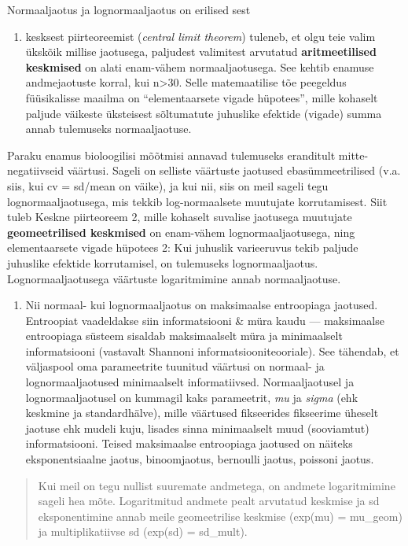 \documentclass[]{book}
\providecommand{\tightlist}{%
  \setlength{\itemsep}{0pt}\setlength{\parskip}{0pt}}
\begin{document}
Normaaljaotus ja lognormaaljaotus on erilised sest

\begin{enumerate}
\def\labelenumi{(\arabic{enumi})}
\tightlist
\item
  kesksest piirteoreemist (\emph{central limit theorem}) tuleneb, et olgu teie valim ükskõik millise jaotusega, paljudest valimitest arvutatud \textbf{aritmeetilised keskmised} on alati enam-vähem normaaljaotusega. See kehtib enamuse andmejaotuste korral, kui n\textgreater{}30.
  Selle matemaatilise tõe peegeldus füüsikalisse maailma on ``elementaarsete vigade hüpotees'', mille kohaselt paljude väikeste üksteisest sõltumatute juhuslike efektide (vigade) summa annab tulemuseks normaaljaotuse.
\end{enumerate}

Paraku enamus bioloogilisi mõõtmisi annavad tulemuseks eranditult mitte-negatiivseid väärtusi.
Sageli on selliste väärtuste jaotused ebasümmeetrilised (v.a. siis, kui cv = sd/mean on väike), ja kui nii, siis on meil sageli tegu lognormaaljaotusega, mis tekkib log-normaalsete muutujate korrutamisest.
Siit tuleb Keskne piirteoreem 2, mille kohaselt suvalise jaotusega muutujate \textbf{geomeetrilised keskmised} on enam-vähem lognormaaljaotusega, ning elementaarsete vigade hüpotees 2: Kui juhuslik varieeruvus tekib paljude juhuslike efektide korrutamisel, on tulemuseks lognormaaljaotus.
Lognormaaljaotusega väärtuste logaritmimine annab normaaljaotuse.

\begin{enumerate}
\def\labelenumi{(\arabic{enumi})}
\setcounter{enumi}{1}
\tightlist
\item
  Nii normaal- kui lognormaaljaotus on maksimaalse entroopiaga jaotused.
  Entroopiat vaadeldakse siin informatsiooni \& müra kaudu --- maksimaalse entroopiaga süsteem sisaldab maksimaalselt müra ja minimaalselt informatsiooni (vastavalt Shannoni informatsiooniteooriale). See tähendab, et väljaspool oma parameetrite tuunitud väärtusi on normaal- ja lognormaaljaotused minimaalselt informatiivsed.
  Normaaljaotusel ja lognormaaljaotusel on kummagil kaks parameetrit, \emph{mu} ja \emph{sigma} (ehk keskmine ja standardhälve), mille väärtused fikseerides fikseerime üheselt jaotuse ehk mudeli kuju, lisades sinna minimaalselt muud (sooviamtut) informatsiooni.
  Teised maksimaalse entroopiaga jaotused on näiteks eksponentsiaalne jaotus, binoomjaotus, bernoulli jaotus, poissoni jaotus.
\end{enumerate}

\begin{quote}
Kui meil on tegu nullist suuremate andmetega, on andmete logaritmimine sageli hea mõte. Logaritmitud andmete pealt arvutatud keskmise ja sd eksponentimine annab meile geomeetrilise keskmise (exp(mu) = mu\_geom) ja multiplikatiivse sd (exp(sd) = sd\_mult).
\end{quote}
\end{document}
